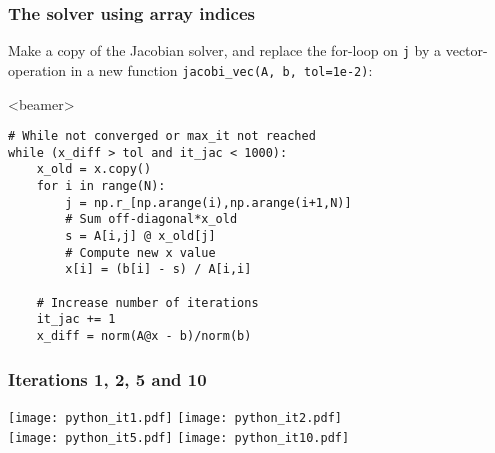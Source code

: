 \begin{frame}[fragile]
  \frametitle{The solver using array indices}
  Make a copy of the Jacobian solver, and replace the for-loop on \lstinline|j| by a vector-operation in a new function \lstinline|jacobi_vec(A, b, tol=1e-2)|:
  \begin{onlyenv}<beamer>
  \begin{lstlisting}[basicstyle=\scriptsize\ttfamily]
# While not converged or max_it not reached
while (x_diff > tol and it_jac < 1000):
    x_old = x.copy()
    for i in range(N):
        j = np.r_[np.arange(i),np.arange(i+1,N)]
        # Sum off-diagonal*x_old
        s = A[i,j] @ x_old[j]
        # Compute new x value
        x[i] = (b[i] - s) / A[i,i]
        
    # Increase number of iterations
    it_jac += 1
    x_diff = norm(A@x - b)/norm(b)
    \end{lstlisting}
  \end{onlyenv}
\end{frame}

\begin{frame}[fragile]
  \frametitle{Iterations 1, 2, 5 and 10}
  \texttt{[image: python\_it1.pdf]} \hspace{0.5cm}
  \texttt{[image: python\_it2.pdf]}\\
  \texttt{[image: python\_it5.pdf]} \hspace{0.5cm} \texttt{[image: python\_it10.pdf]}
\end{frame}

